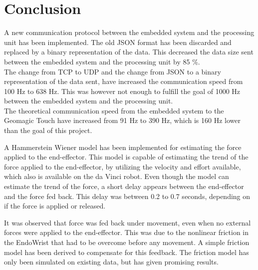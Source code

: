 \chapter{Conclusion}\label{cha:conclusion}


A new communication protocol between the embedded system and the processing unit has been implemented. The old JSON format has been discarded and replaced by a binary representation of the data. This decreased the data size sent between the embedded system and the processing unit by 85 \%.\\ 
The change from TCP to UDP and the change from JSON to a binary representation of the data sent, have increased the communication speed from 100 Hz to 638 Hz. This was however not enough to fulfill the goal of 1000 Hz between the embedded system and the processing unit.\\
The theoretical communication speed from the embedded system to the Geomagic Touch have increased from 91 Hz to 390 Hz, which is 160 Hz lower than the goal of this project. 



A Hammerstein Wiener model has been implemented for estimating the force applied to the end-effector. This model is capable of estimating the trend of the force applied to the end-effector, by utilizing the velocity and effort available, which also is available on the da Vinci robot. Even though the model can estimate the trend of the force, a short delay appears between the end-effector and the force fed back. This delay was between 0.2 to 0.7 seconds, depending on if the force is applied or released. 



It was observed that force was fed back under movement, even when no external forces were applied to the end-effector. This was due to the nonlinear friction in the EndoWrist that had to be overcome before any movement. A simple friction model has been derived to compensate for this feedback. The friction model has only been simulated on existing data, but has given promising results. 


